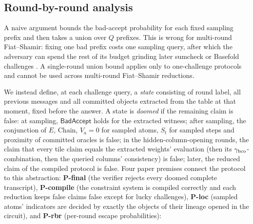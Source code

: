 \documentclass[10pt]{article}
\begin{document}
\subsection{Round-by-round analysis}
A naive argument bounds the bad-accept probability for each fixed sampling prefix and then takes a union over $Q$ prefixes. This is wrong for multi-round Fiat--Shamir: fixing one bad prefix costs one sampling query, after which the adversary can spend the rest of its budget grinding later sumcheck or Basefold challenges \cite{BCS16,CCH+19,CMS19}. A single-round union bound applies only to one-challenge protocols and cannot be used across multi-round Fiat--Shamir reductions.

We instead define, at each challenge query, a \emph{state} consisting of round label, all previous messages and all committed objects extracted from the table at that moment, fixed before the answer. A state is \emph{doomed} if the remaining claim is false: at sampling, $\mathsf{BadAccept}$ holds for the extracted witness; after sampling, the conjunction of $E$, $\mathrm{Chain}$, $V_a=0$ for sampled atoms, $S_t$ for sampled steps and proximity of committed oracles is false; in the hidden-column-opening rounds, the claim that every tile claim equals the extracted weights' evaluation (then its $\gamma_{\rm hco}$-combination, then the queried columns' consistency) is false; later, the reduced claim of the compiled protocol is false. Four paper premises connect the protocol to this abstraction: \textbf{P-final} (the verifier rejects every doomed complete transcript), \textbf{P-compile} (the constraint system is compiled correctly and each reduction keeps false claims false except for lucky challenges), \textbf{P-loc} (sampled atoms' indicators are decided by exactly the objects of their lineage opened in the circuit), and \textbf{P-rbr} (per-round escape probabilities):
\end{document}
